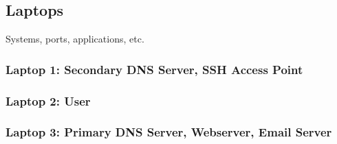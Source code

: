 \subsection{Laptops}

Systems, ports, applications, etc.

\subsubsection{Laptop 1: Secondary DNS Server, SSH Access Point}

\subsubsection{Laptop 2: User}

\subsubsection{Laptop 3: Primary DNS Server, Webserver, Email Server}





